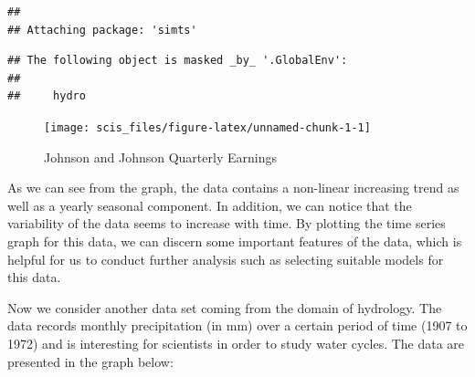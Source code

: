 \documentclass[]{book}
\newenvironment{Shaded}{\begin{snugshade}}{\end{snugshade}}
\newcommand{\CommentTok}[1]{\textcolor[rgb]{0.56,0.35,0.01}{\textit{#1}}}
\newcommand{\DataTypeTok}[1]{\textcolor[rgb]{0.13,0.29,0.53}{#1}}
\newcommand{\DecValTok}[1]{\textcolor[rgb]{0.00,0.00,0.81}{#1}}
\newcommand{\KeywordTok}[1]{\textcolor[rgb]{0.13,0.29,0.53}{\textbf{#1}}}
\newcommand{\NormalTok}[1]{#1}
\newcommand{\StringTok}[1]{\textcolor[rgb]{0.31,0.60,0.02}{#1}}
\theoremstyle{definition}
\theoremstyle{definition}
\theoremstyle{definition}
\theoremstyle{remark}
\let\BeginKnitrBlock\begin \let\EndKnitrBlock\end
\begin{document}
\begin{verbatim}
## 
## Attaching package: 'simts'
\end{verbatim}

\begin{verbatim}
## The following object is masked _by_ '.GlobalEnv':
## 
##     hydro
\end{verbatim}

\begin{Shaded}
\end{Shaded}

\begin{figure}

{\centering \texttt{[image: scis\_files/figure-latex/unnamed-chunk-1-1]} 

}

\caption{Johnson and Johnson Quarterly Earnings}\label{fig:unnamed-chunk-1}
\end{figure}

As we can see from the graph, the data contains a non-linear increasing
trend as well as a yearly seasonal component. In addition, we can notice
that the variability of the data seems to increase with time. By
plotting the time series graph for this data, we can discern some
important features of the data, which is helpful for us to conduct
further analysis such as selecting suitable models for this data.

\BeginKnitrBlock{example}[Monthly Precipitation Data]
\protect\hypertarget{exm:examplePrecipitation}{}{\label{exm:examplePrecipitation}
{} }Now we consider another
data set coming from the domain of hydrology. The data records monthly
precipitation (in mm) over a certain period of time (1907 to 1972) and
is interesting for scientists in order to study water cycles. The data
are presented in the graph below:
\EndKnitrBlock{example}
\end{document}
